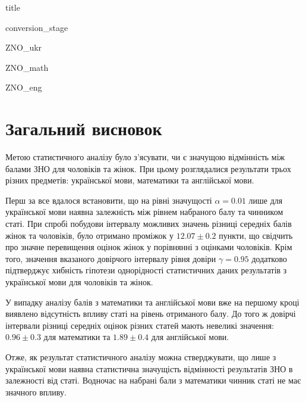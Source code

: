 \documentclass[a4paper,14pt]{extarticle} %
\begin{document}
{title}

\tableofcontents

\newpage
{conversion_stage}

\newpage
{ZNO_ukr}

\newpage
{ZNO_math}

{ZNO_eng}

\section*{Загальний висновок}

Метою статистичного аналізу було з'ясувати, чи є значущою відмінність між балами ЗНО для чоловіків 
та жінок. При цьому розглядалися результати трьох різних предметів: української мови, математики та 
англійської мови.

Перш за все вдалося встановити, що на рівні значущості $\alpha=0.01$ лише для української мови наявна 
залежність між рівнем набраного балу та чинником статі. При спробі побудови інтервалу можливих значень різниці 
середніх балів жінок та чоловіків, було отримано проміжок у $12.07\pm 0.2$ пункти, що свідчить про значне 
перевищення оцінок жінок у порівнянні з оцінками чоловіків. Крім того, значення вказаного довірчого інтервалу 
рівня довіри $\gamma=0.95$ додатково підтверджує хиб\-ність гіпотези однорідності статистичних даних результатів 
з української мови для чоловіків та жінок. 

У випадку аналізу балів з математики та англійської мови вже на першому кроці виявлено відсутність впливу статі 
на рівень отриманого балу. До того ж довірчі інтервали різниці середніх оцінок різних статей мають невеликі 
значення: $0.96\pm 0.3$ для математики та $1.89\pm 0.4$ для англійської мови. 

Отже, як результат статистичного аналізу можна стверджувати, що лише з української мови наявна статистична 
значущість відмінності результатів ЗНО в залежності від статі. Водночас на набрані бали з математики чинник 
статі не має значного впливу.
\end{document}
